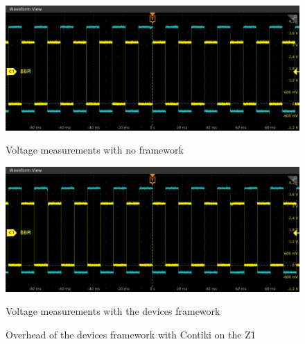 \begin{figure}[!ht]
  \begin{minipage}{.45\textwidth}
      \centering
      \includegraphics[scale=.25]{assets/reference-value-overhead-contiki-z1.png}
      \caption*{Voltage measurements with no framework}
  \end{minipage}\hfill
  \begin{minipage}{.45\textwidth}        
      \centering
      \includegraphics[scale=.25]{assets/devices-framework-overhead-contiki-z1.png}
      \caption*{Voltage measurements with the devices framework}
  \end{minipage}
  \caption{Overhead of the devices framework with Contiki on the Z1}
\end{figure}